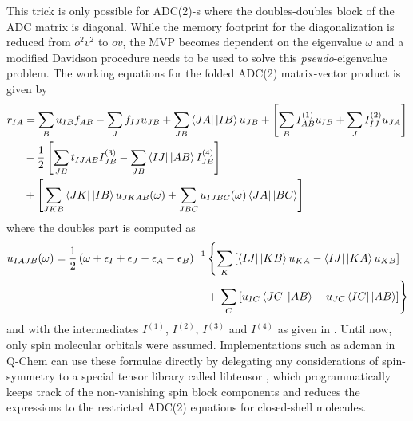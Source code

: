 \noindent This trick is only possible for ADC(2)-s where the doubles-doubles block of the ADC matrix is diagonal. While the memory footprint for the diagonalization is reduced from $o^2v^2$ to $ov$, the MVP becomes dependent on the eigenvalue $\omega$ and a modified Davidson procedure needs to be used to solve this \emph{pseudo}-eigenvalue problem. The working equations for the folded ADC(2) matrix-vector product is given by \cite{Wor2009}
\begin{align}
\begin{split}
r_{IA} &= \sum_B u_{IB} f_{AB} - \sum_J f_{IJ} u_{JB} + \sum_{JB} \sbra{JA}\sket{IB} u_{JB} + \left[ \sum_B I^{(1)}_{AB} u_{IB} + \sum_J I^{(2)}_{IJ} u_{JA}\right] \\
&- \frac{1}{2} \left[ \sum_{JB} t_{IJAB} I^{(3)}_{JB} - \sum_{JB} \sbra{IJ}\sket{AB} I^{(4)}_{JB} \right] \\
&+ \left[\sum_{JKB} \sbra{JK}\sket{IB} u_{JKAB}(\omega) + \sum_{JBC} u_{IJBC}(\omega) \sbra{JA}\sket{BC}\right]
\end{split}
\end{align}
\noindent where the doubles part is computed as
\begin{equation}
\begin{split}
u_{IAJB}(\omega) = \frac{1}{2} \left( \omega + \eps_I + \eps_J - \eps_A - \eps_B \right)^{-1} & \left\lbrace \sum_K \left[ \sbra{IJ}\sket{KB} u_{KA} - \sbra{IJ}\sket{KA} u_{KB} \right] \right. \\ 
& + \left. \sum_C \left[ u_{IC} \sbra{JC}\sket{AB} - u_{JC} \sbra{IC}\sket{AB} \right] \right\rbrace 
\end{split}
\end{equation}
\noindent and with the intermediates $I^{(1)}$, $I^{(2)}$, $I^{(3)}$ and $I^{(4)}$ as given in \cite{Wor2009}. Until now, only spin molecular orbitals were assumed. Implementations such as adcman in Q-Chem \cite{Sha2006} can use these formulae directly by delegating any considerations of spin-symmetry to a special tensor library called libtensor \cite{Epi2013}, which programmatically keeps track of the non-vanishing spin block components and reduces the expressions to the restricted ADC(2) equations for closed-shell molecules.


